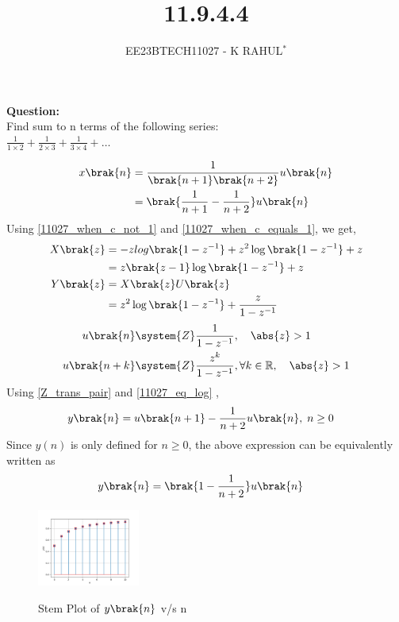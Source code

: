 \documentclass[journal,12pt,twocolumn]{IEEEtran}
\theoremstyle{remark}
\begin{document}

\vspace{3cm}
\title{11.9.4.4}
\author{EE23BTECH11027 - K RAHUL$^{*}$%
}
\maketitle
\newpage
\bigskip
\renewcommand{\thefigure}{\theenumi}
\renewcommand{\thetable}{\theenumi}
\textbf{Question:} \\
Find sum to n terms of the following series:\\
$\frac{1}{1 \times 2} + \frac{1}{2 \times 3} + \frac{1}{3 \times 4} + \ldots$
\bigskip \bigskip

\fi
\solution
\begin{table}[ht]

\end{table}
\begin{align}
x\brak{n} &= \frac{1}{\brak{n+1}\brak{n+2}}u\brak{n}\\
& = \brak{\frac{1}{n+1} - \frac{1}{n+2}}u\brak{n}
\end{align}
Using \eqref{11027_when_c_not_1} and \eqref{11027_when_c_equals_1}, we get,
\begin{align}X\brak{z} &= -z log\brak{1-z^{-1}} + z^2 \log\brak{1-z^{-1}} + z\\
&= z\brak{z-1}\log\brak{1-z^{-1}} + z\\
    Y\brak{z} &= X\brak{z}U\brak{z}\\
     &=z^2\log\brak{1-z^{-1}} + \frac{z}{1-z^{-1}}
\end{align}
\begin{align}
	u\brak{n} &\system{Z} \frac{1}{1-z^{-1}} , \quad \abs{z} > 1\\
	u\brak{n+k} &\system{Z} \frac{z^k}{1-z^{-1}}, \forall k\in \mathbb{R}, \quad \abs{z} > 1 \label{Z_trans_pair}
\end{align}
Using \eqref{Z_trans_pair} and \eqref{11027_eq_log} ,
\begin{align}
    y\brak{n} &= u\brak{n+1} - \frac{1}{n+2}u\brak{n} , \; n \geq 0
\end{align}
Since $y(n)$ is only defined for $n \geq 0$, the above expression can be equivalently written as
\begin{align}
	y\brak{n} &= \brak{1-\frac{1}{n+2}} u\brak{n}
\end{align}
\begin{figure}[h]
    \includegraphics[width=0.3\textwidth]{ncert-maths/11/9/9/4/figs/y(n)_vs_n.png}\label{fig:stem-plot}
    \caption{Stem Plot of $y\brak{n}$ v/s n}
\end{figure}
\end{document}
